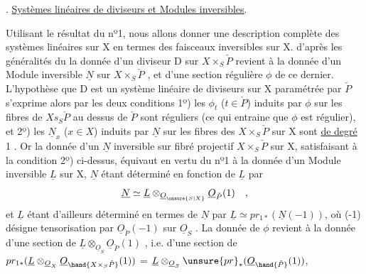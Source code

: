 
. \uline{Systèmes linéaires de diviseurs et Modules inversibles}.

Utilisant le résultat du nº1, nous allons donner une description
complète des systèmes linéaires sur X en termes des faisceaux inversibles
sur X.   d'après les généralités du  la donnée d'un
diviseur  D sur $X\times_S\check{P}$  revient à la
donnée d'un Module inversible $\underline{N}$ sur $X\times_S\check{P}$ , et d'une section régulière
$\phi$ de ce dernier.  L'hypothèse que D est un système linéaire de
diviseurs sur X paramétrée par $\check{P}$ s'exprime alors par les deux conditions
1º) les $\phi_t$ ($t\in\check{P}$) induits par $\phi$ sur les fibres de $Xs_S\check{P}$ au dessus de $\check{P}$
sont réguliers (ce qui entraine que $\phi$ est régulier), et 2º) les $\underline{N}_x$ ($x\in X$)
induits par $\underline{N}$  sur les fibres des $X\times_S\check{P}$ sur X sont \uline{de degré} 1 .
Or la donnée d'un $\underline{N}$ inversible sur  fibré projectif $X\times_S\check{P}$ sur X,
satisfaisant à la condition 2º) ci-dessus, équivaut en vertu du nº1
à la donnée d'un Module inversible $\underline{L}$ sur X, $\underline{N}$ étant déterminé en fonction
de $\underline{L}$ par
\[ \underline{N}\simeq\underline{L}\otimes_{\underline{O}_{\unsure{S|X}}}\underline{O}_{\check{P}}(1) \quad , \]
et $\underline{L}$ étant d'ailleurs déterminé en termes de $\underline{N}$ par $\underline{L}\simeq pr_{1*}(\underline{N}(-1))$,
où (-1) désigne  tensorisation par $\underline{O}_{\check{P}}(-1)$ sur $\underline{O}_S$ . La donnée de $\phi$
revient à la donnée d'une section de $\underline{L}\otimes_{\underline{O}_S}\underline{O}_{\check{P}}(1)$ , i.e. d'une section
de $pr_{1*}(\underline{L}\otimes_{\underline{O}_X}\underline{O}_{\hand{X\times_S\check{P}}}(1))$ = $\underline{L}\otimes_{\underline{O}_S}\unsure{pr}_*(\underline{O}_{\hand{\check{P}}}(1))$, 
